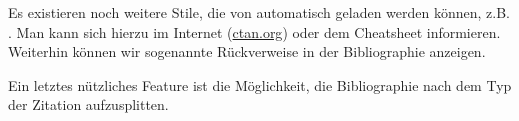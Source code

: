 Es existieren noch weitere Stile, die von  automatisch geladen werden können, z.B. .
Man kann sich hierzu im Internet (\url{ctan.org}) oder dem Cheatsheet informieren.
Weiterhin können wir sogenannte Rückverweise in der Bibliographie anzeigen.
\begin{latexlisting}
	\usepackage[backref=true]{biblatex}
\end{latexlisting}
Ein letztes nützliches Feature ist die Möglichkeit, die Bibliographie nach dem Typ der Zitation aufzusplitten.
\begin{latexlisting}
	\printbibliography[title={Bücher}, type=books]
	\printbibliography[title={Andere Quellen}, nottype=books]
\end{latexlisting}
